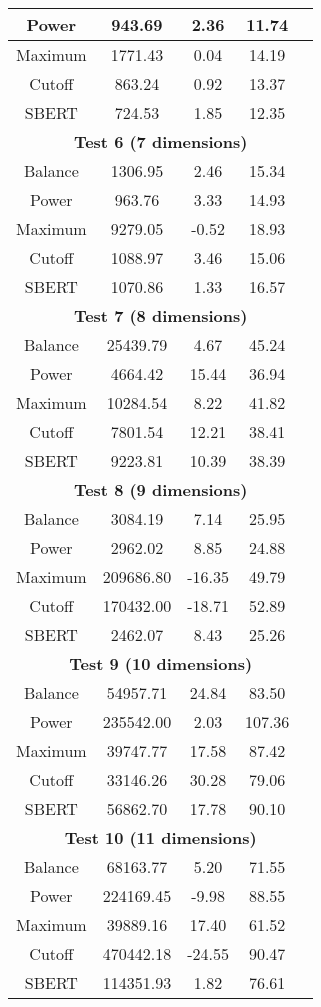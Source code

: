 \documentclass{article}
\begin{document}
\begin{table}[H]
{\begin{tabular}{|c|c|c|c|c|}
Power & 943.69 & 2.36 & 11.74 \\ \hline
Maximum & 1771.43 & 0.04 & 14.19 \\ \hline
Cutoff & 863.24 & 0.92 & 13.37 \\ \hline
SBERT & 724.53 & 1.85 & 12.35 \\ \hline
\multicolumn{5}{|c|}{\textbf{Test 6 (7 dimensions)}} \\ \hline
Balance & 1306.95 & 2.46 & 15.34 \\ \hline
Power & 963.76 & 3.33 & 14.93 \\ \hline
Maximum & 9279.05 & -0.52 & 18.93 \\ \hline
Cutoff & 1088.97 & 3.46 & 15.06 \\ \hline
SBERT & 1070.86 & 1.33 & 16.57 \\ \hline
\multicolumn{5}{|c|}{\textbf{Test 7 (8 dimensions)}} \\ \hline
Balance & 25439.79 & 4.67 & 45.24 \\ \hline
Power & 4664.42 & 15.44 & 36.94 \\ \hline
Maximum & 10284.54 & 8.22 & 41.82 \\ \hline
Cutoff & 7801.54 & 12.21 & 38.41 \\ \hline
SBERT & 9223.81 & 10.39 & 38.39 \\ \hline
\multicolumn{5}{|c|}{\textbf{Test 8 (9 dimensions)}} \\ \hline
Balance & 3084.19 & 7.14 & 25.95 \\ \hline
Power & 2962.02 & 8.85 & 24.88 \\ \hline
Maximum & 209686.80 & -16.35 & 49.79 \\ \hline
Cutoff & 170432.00 & -18.71 & 52.89 \\ \hline
SBERT & 2462.07 & 8.43 & 25.26 \\ \hline
\multicolumn{5}{|c|}{\textbf{Test 9 (10 dimensions)}} \\ \hline
Balance & 54957.71 & 24.84 & 83.50 \\ \hline
Power & 235542.00 & 2.03 & 107.36 \\ \hline
Maximum & 39747.77 & 17.58 & 87.42 \\ \hline
Cutoff & 33146.26 & 30.28 & 79.06 \\ \hline
SBERT & 56862.70 & 17.78 & 90.10 \\ \hline
\multicolumn{5}{|c|}{\textbf{Test 10 (11 dimensions)}} \\ \hline
Balance & 68163.77 & 5.20 & 71.55 \\ \hline
Power & 224169.45 & -9.98 & 88.55 \\ \hline
Maximum & 39889.16 & 17.40 & 61.52 \\ \hline
Cutoff & 470442.18 & -24.55 & 90.47 \\ \hline
SBERT & 114351.93 & 1.82 & 76.61 \\ \hline
\end{tabular}%
}
\end{table}
\end{document}
